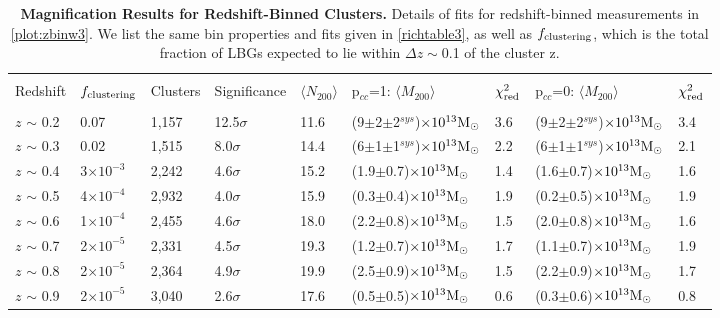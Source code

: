 \begin{landscape}
\begin{table}
  \centering
    \caption[Magnification Results for Redshift-Binned Clusters]{{\bf Magnification Results for Redshift-Binned Clusters.} Details of fits for redshift-binned measurements in \autoref{plot:zbinw3}. We list the same bin properties and fits given in \autoref{richtable3}, as well as $f_{\rm clustering}$, which is the total fraction of \ac{LBG}s expected to lie within $\Delta z \sim$0.1 of the cluster z.}
    \label{ztable3}
    \begin{tabular}{lllllllll}
      \hline \\[-10pt]
      Redshift & $f_{\rm clustering}$ & Clusters & Significance & $\langle N_{200} \rangle$ & p$_{cc}$=1: $\langle M_{200} \rangle$ & $\chi^2_{\rm red}$  & p$_{cc}$=0: $\langle M_{200} \rangle$ & $\chi^2_{\rm red}$ \\[2pt] \hline \\[-10pt]
      $z$ $\sim$ 0.2 & 0.07 & 1,157 & 12.5$\sigma$ & 11.6 & (9$\pm$2$\pm$2$^{sys}$)$\times10^{13} {\rm M}_{\odot}$ & 3.6 & (9$\pm$2$\pm$2$^{sys}$)$\times10^{13} {\rm M}_{\odot}$ & 3.4  \\
      $z$ $\sim$ 0.3 & 0.02 & 1,515 & 8.0$\sigma$ & 14.4 & (6$\pm$1$\pm$1$^{sys}$)$\times10^{13} {\rm M}_{\odot}$ & 2.2 & (6$\pm$1$\pm$1$^{sys}$)$\times10^{13} {\rm M}_{\odot}$ & 2.1  \\
      $z$ $\sim$ 0.4 & 3$\times10^{-3}$ & 2,242 & 4.6$\sigma$ & 15.2 & (1.9$\pm$0.7)$\times10^{13} {\rm M}_{\odot}$ & 1.4 & (1.6$\pm$0.7)$\times10^{13} {\rm M}_{\odot}$ & 1.6  \\
      $z$ $\sim$ 0.5 & 4$\times10^{-4}$ & 2,932 & 4.0$\sigma$ & 15.9 & (0.3$\pm$0.4)$\times10^{13} {\rm M}_{\odot}$ & 1.9 & (0.2$\pm$0.5)$\times10^{13} {\rm M}_{\odot}$ & 1.9  \\
      $z$ $\sim$ 0.6 & 1$\times10^{-4}$ & 2,455 & 4.6$\sigma$ & 18.0 & (2.2$\pm$0.8)$\times10^{13} {\rm M}_{\odot}$ & 1.5 & (2.0$\pm$0.8)$\times10^{13} {\rm M}_{\odot}$ & 1.6  \\
      $z$ $\sim$ 0.7 & 2$\times10^{-5}$ & 2,331 & 4.5$\sigma$ & 19.3 & (1.2$\pm$0.7)$\times10^{13} {\rm M}_{\odot}$ & 1.7 & (1.1$\pm$0.7)$\times10^{13} {\rm M}_{\odot}$ & 1.9  \\
      $z$ $\sim$ 0.8 & 2$\times10^{-5}$ & 2,364 & 4.9$\sigma$ & 19.9 & (2.5$\pm$0.9)$\times10^{13} {\rm M}_{\odot}$ & 1.5 & (2.2$\pm$0.9)$\times10^{13} {\rm M}_{\odot}$ & 1.7  \\ 
      $z$ $\sim$ 0.9 & 2$\times10^{-5}$ & 3,040 & 2.6$\sigma$ & 17.6 & (0.5$\pm$0.5)$\times10^{13} {\rm M}_{\odot}$ & 0.6 & (0.3$\pm$0.6)$\times10^{13} {\rm M}_{\odot}$ & 0.8  \\[2pt]
      \hline
    \end{tabular}
\end{table}
\end{landscape}



